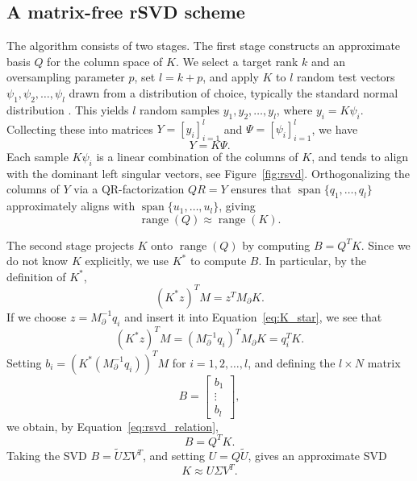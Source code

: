 \subsection{A matrix-free rSVD scheme}\label{sec:a_matrix_free_rsvd_scheme}

The algorithm consists of two stages. The first stage constructs an approximate basis $Q$ for the column space of $K$. We select a target rank $k$ and an oversampling parameter $p$, set $l = k + p$, and apply $K$ to $l$ random test vectors $\psi_1, \psi_2, \dots, \psi_l$ drawn from a distribution of choice, typically the standard normal distribution \cite{halkoFindingStructureRandomness2011}. This yields $l$ random samples $y_1, y_2, \dots, y_l$, where $y_i = K \psi_i$. Collecting these into matrices $Y = [y_i]_{i=1}^l$ and $\Psi = [\psi_i]_{i=1}^l$, we have
\begin{equation*}
    Y = K \Psi.
\end{equation*}
Each sample $K\psi_i$ is a linear combination of the columns of $K$, and tends to align with the dominant left singular vectors, see Figure~\ref{fig:rsvd}. Orthogonalizing the columns of $Y$ via a QR-factorization $QR = Y$ ensures that $\operatorname{span}\{q_1, \ldots, q_l\}$ approximately aligns with $\operatorname{span}\{u_1, \ldots, u_l\}$, giving
\begin{equation*}
    \operatorname{range}(Q) \approx \operatorname{range}(K).
\end{equation*}

The second stage projects $K$ onto $\operatorname{range}(Q)$ by computing $B = Q^T K$. Since we do not know $K$ explicitly, we use $K^*$ to compute $B$. In particular, by the definition of $K^*$,
\begin{equation}\label{eq:K_star}
    (K^* z)^T M = z^T M_\partial K.
\end{equation}
If we choose $z = M_{\partial}^{-1} q_i$ and insert it into Equation~\eqref{eq:K_star}, we see that
\begin{equation}\label{eq:rsvd_relation}
    (K^* z)^T M
    = (M_{\partial}^{-1} q_i)^T M_{\partial} K
    = q_i^T K.
\end{equation}
Setting $b_i = (K^* (M_{\partial}^{-1} q_i))^T M$ for $i = 1, 2, \dots, l$, and defining the $l \times N$ matrix
\begin{equation*}
    B = \begin{bmatrix} b_1 \\ \vdots \\ b_l \end{bmatrix},
\end{equation*}
we obtain, by Equation~\eqref{eq:rsvd_relation},
\begin{equation*}
    B = Q^T K.
\end{equation*}
Taking the SVD $B = \tilde U \Sigma V^T$, and setting $U = Q \tilde U$, gives an approximate SVD
\begin{equation}\label{eq:rsvd_approx}
    K \approx U \Sigma V^T.
\end{equation}

